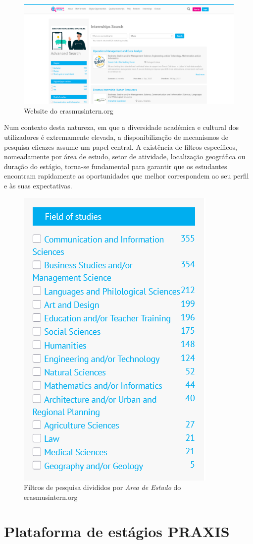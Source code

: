 \begin{figure}[h!tbp]
    \centering
    \includegraphics[width=\linewidth]{capitulos/cap2-estadodaarte/assets/image/esn/internship-org.png}
    \caption{Website do erasmusintern.org}
    \label{fig:erasmus-intern-org}
\end{figure}

Num contexto desta natureza, em que a diversidade académica e cultural dos utilizadores é extremamente elevada, a disponibilização de mecanismos de pesquisa eficazes assume um papel central. A existência de filtros específicos, nomeadamente por área de estudo, setor de atividade, localização geográfica ou duração do estágio, torna-se fundamental para garantir que os estudantes encontram rapidamente as oportunidades que melhor correspondem ao seu perfil e às suas expectativas.

\begin{figure}[h!tbp]
    \centering
    \includegraphics[width=0.3\linewidth]{capitulos/cap2-estadodaarte/assets/image/esn/erasmus-intern filters.png}
    \caption{Filtros de pesquisa divididos por \textit{Area de Estudo} do erasmusintern.org}
    \label{fig:erasmus-intern-org}
\end{figure}

\section{Plataforma de estágios PRAXIS}

